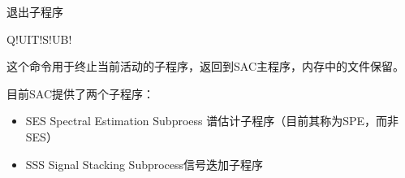 \label{cmd:quitsub}

退出子程序

\begin{SACSTX}
Q!UIT!S!UB!
\end{SACSTX}

这个命令用于终止当前活动的子程序，返回到SAC主程序，内存中的文件保留。

目前SAC提供了两个子程序：
\begin{itemize}
\item SES Spectral Estimation Subproess 谱估计子程序（目前其称为SPE，而非SES）
\item SSS Signal Stacking Subprocess信号迭加子程序
\end{itemize}
